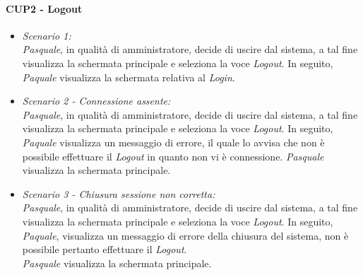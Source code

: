 \paragraph{CUP2 - Logout\\}
\begin{itemize}
	\item \textit{Scenario 1:\\}
	\textit{Pasquale}, in qualità di amministratore, decide di uscire dal sistema, a tal fine visualizza la schermata principale e seleziona la voce \textit{Logout}. In seguito, \textit{Paquale} visualizza la schermata relativa al \textit{Login}.\\
	
	\item \textit{Scenario 2 - Connessione assente:\\}
	\textit{Pasquale}, in qualità di amministratore, decide di uscire dal sistema, a tal fine visualizza la schermata principale e seleziona la voce \textit{Logout}. In seguito, \textit{Paquale} visualizza un messaggio di errore, il quale lo avvisa che non è possibile effettuare il \textit{Logout} in quanto non vi è connessione. \textit{Pasquale} visualizza la schermata principale.\\
	
	\item \textit{Scenario 3 - Chiusura sessione non corretta:\\}
	\textit{Pasquale}, in qualità di amministratore, decide di uscire dal sistema, a tal fine visualizza la schermata principale e seleziona la voce \textit{Logout}. In seguito, \textit{Paquale}, visualizza un messaggio di errore della chiusura del sistema, non è possibile pertanto effettuare il \textit{Logout}.\\
	\textit{Pasquale} visualizza la schermata principale.\\
\end{itemize}

